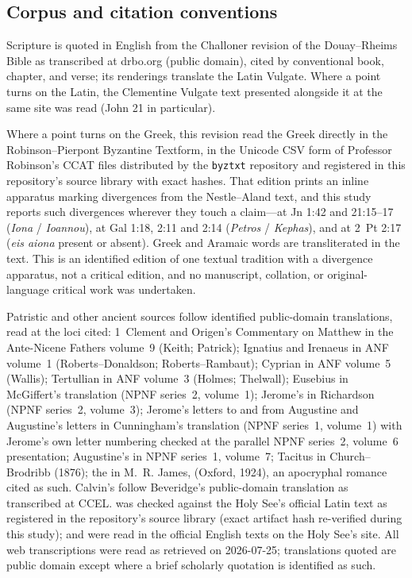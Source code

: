 \subsection{Corpus and citation conventions}

Scripture is quoted in English from the Challoner revision of the
Douay--Rheims Bible as transcribed at drbo.org (public domain), cited by
conventional book, chapter, and verse; its renderings translate the Latin
Vulgate. Where a point turns on the Latin, the Clementine Vulgate text
presented alongside it at the same site was read (John 21 in particular).

Where a point turns on the Greek, this revision read the Greek directly in
the Robinson--Pierpont Byzantine Textform, in the Unicode CSV form of
Professor Robinson's CCAT files distributed by the \texttt{byztxt} repository
and registered in this repository's source library with exact hashes. That
edition prints an inline apparatus marking divergences from the
Nestle--Aland text, and this study reports such divergences wherever they
touch a claim---at Jn 1:42 and 21:15--17 (\textit{Iona} / \textit{Ioannou}),
at Gal 1:18, 2:11 and 2:14 (\textit{Petros} / \textit{Kephas}), and at
2~Pt 2:17 (\textit{eis aiona} present or absent). Greek and Aramaic words are
transliterated in the text. This is an identified edition of one textual
tradition with a divergence apparatus, not a critical edition, and no
manuscript, collation, or original-language critical work was undertaken.

Patristic and other ancient sources follow identified public-domain
translations, read at the loci cited: 1~Clement and Origen's Commentary on
Matthew in the Ante-Nicene Fathers volume~9 (Keith; Patrick); Ignatius and
Irenaeus in ANF volume~1 (Roberts--Donaldson; Roberts--Rambaut); Cyprian in
ANF volume~5 (Wallis); Tertullian in ANF volume~3 (Holmes; Thelwall);
Eusebius in McGiffert's translation (NPNF series~2, volume~1); Jerome's
 in Richardson (NPNF series~2, volume~3); Jerome's
letters to and from Augustine and Augustine's letters in Cunningham's
translation (NPNF series~1, volume~1) with Jerome's own letter numbering
checked at the parallel NPNF series~2, volume~6 presentation; Augustine's
 in NPNF series~1, volume~7; Tacitus in
Church--Brodribb (1876); the  in M.~R. James,
 (Oxford, 1924), an apocryphal romance
cited as such. Calvin's  follow Beveridge's public-domain
translation as transcribed at CCEL.  was checked
against the Holy See's official Latin text as registered in the repository's
source library (exact artifact hash re-verified during this study);
 and  were read in the official
English texts on the Holy See's site. All web transcriptions were read as
retrieved on 2026-07-25; translations quoted are public domain except where
a brief scholarly quotation is identified as such.

